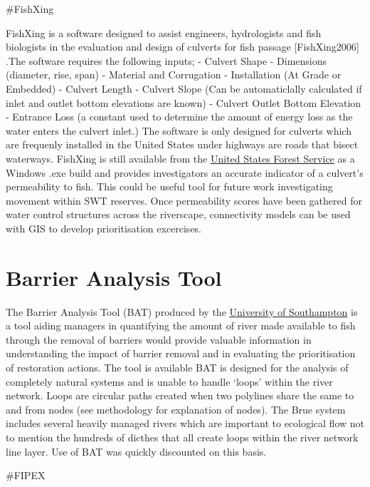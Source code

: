 \documentclass[]{article}
\begin{document}
\#FishXing

FishXing is a software designed to assist engineers, hydrologists and
fish biologists in the evaluation and design of culverts for fish
passage {[}FishXing2006{]} .The software requires the following inputs;
- Culvert Shape - Dimensions (diameter, rise, span) - Material and
Corrugation - Installation (At Grade or Embedded) - Culvert Length -
Culvert Slope (Can be automaticlally calculated if inlet and outlet
bottom elevations are known) - Culvert Outlet Bottom Elevation -
Entrance Loss (a constant used to determine the amount of energy loss as
the water enters the culvert inlet.) The software is only designed for
culverts which are frequenly installed in the United States under
highways are roads that bisect waterways. FishXing is still available
from the \href{https://www.fs.fed.us/biology/nsaec/fishxing/}{United
States Forest Service} as a Windows .exe build and provides
investigators an accurate indicator of a culvert's permeability to fish.
This could be useful tool for future work investigating movement within
SWT reserves. Once permeability scores have been gathered for water
control structures across the riverscape, connectivity models can be
used with GIS to develop prioritisation excercises.

\hypertarget{barrier-analysis-tool}{%
\section{Barrier Analysis Tool}\label{barrier-analysis-tool}}

The Barrier Analysis Tool (BAT) produced by the
\href{https://www.geodata.soton.ac.uk/geodata/gis/project173}{University
of Southampton} is a tool aiding managers in quantifying the amount of
river made available to fish through the removal of barriers would
provide valuable information in understanding the impact of barrier
removal and in evaluating the prioritisation of restoration actions. The
tool is available BAT is designed for the analysis of completely natural
systems and is unable to handle `loops' within the river network. Loops
are circular paths created when two polylines share the same to and from
nodes (see methodology for explanation of nodes). The Brue system
includes several heavily managed rivers which are important to
ecological flow not to mention the hundreds of dicthes that all create
loops within the river network line layer. Use of BAT was quickly
discounted on this basis.

\#FIPEX
\end{document}
